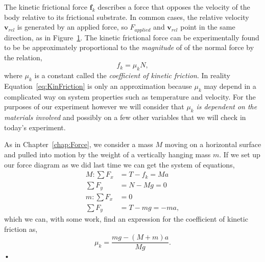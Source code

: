 \documentclass[main.tex]{subfiles}
\begin{document}
\begin{figure}
\centering
{}
\caption{} \label{fig:KinFriction}
\end{figure}
The kinetic frictional force $\boldsymbol{f}_k$ describes a force that opposes the velocity of the body relative to its frictional substrate. In common cases, the relative velocity $\mathbf{v}_{rel}$ is generated by an applied force, so $F_{applied}$ and $\mathbf{v}_{rel}$ point in the same direction, as in Figure~\ref{fig:KinFriction}. The kinetic frictional force can be experimentally found to be be approximately proportional to the \emph{magnitude} of of the normal force by the relation,
\begin{equation} \label{eq:KinFriction}
f_k=\mu_kN,
\end{equation}
where $\mu_k$ is a constant called the \emph{coefficient of kinetic friction}. In reality Equation~\eqref{eq:KinFriction} is only an approximation because $\mu_k$ may depend in a complicated way on system properties such as temperature and velocity.  For the purposes of our experiment however we will consider that $\mu_k$ \emph{is dependent on the materials involved} and possibly on a few other variables that we will check in today's experiment.

As in Chapter~\ref{chap:Force}, we consider a mass $M$ moving on a horizontal surface and pulled into motion by the weight of a vertically hanging mass $m.$ If we set up our force diagram as we did last time we can get the system of equations,
\begin{subequations}
\begin{align}
M: 	\sum F_x &= T-f_k=Ma\\
	\sum F_y &=N-Mg=0\\
m:	\sum F_x &=0\\
	\sum	F_y &=T-mg=-ma,
\end{align}
\end{subequations}
which we can, with some work, find an expression for the coefficient of kinetic friction as,
\begin{equation} \label{eq:muk}
\mu_k=\frac{mg-(M+m)a}{Mg}.
\end{equation}•
\end{document}
